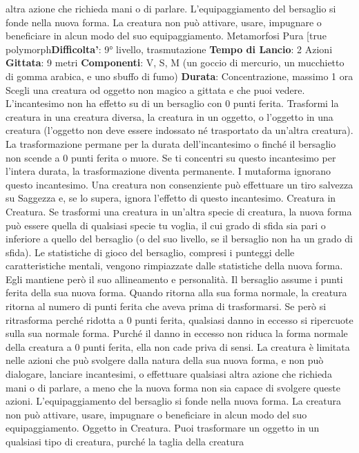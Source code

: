 \begin{multicols}{2}
altra azione che richieda mani o di parlare.
L’equipaggiamento del bersaglio si fonde nella nuova
forma. La creatura non può attivare, usare, impugnare o
beneficiare in alcun modo del suo equipaggiamento.
Metamorfosi Pura
[true polymorph\textbf{Difficolta'}:
9° livello, trasmutazione
\textbf{Tempo di Lancio}: 2 Azioni
\textbf{Gittata}: 9 metri
\textbf{Componenti}: V, S, M (un goccio di mercurio, un
mucchietto di gomma arabica, e uno sbuffo di fumo)
\textbf{Durata}: Concentrazione, massimo 1 ora
Scegli una creatura od oggetto non magico a gittata e
che puoi vedere. L’incantesimo non ha effetto su di un
bersaglio con 0 punti ferita. Trasformi la creatura in una
creatura diversa, la creatura in un oggetto, o l’oggetto in
una creatura (l’oggetto non deve essere indossato né
trasportato da un’altra creatura). La trasformazione
permane per la durata dell’incantesimo o finché il
bersaglio non scende a 0 punti ferita o muore. Se ti
concentri su questo incantesimo per l’intera durata, la
trasformazione diventa permanente.
I mutaforma ignorano questo incantesimo. Una creatura
non consenziente può effettuare un tiro salvezza su
Saggezza e, se lo supera, ignora l’effetto di questo
incantesimo.
Creatura in Creatura. Se trasformi una creatura in
un’altra specie di creatura, la nuova forma può essere
quella di qualsiasi specie tu voglia, il cui grado di sfida
sia pari o inferiore a quello del bersaglio (o del suo
livello, se il bersaglio non ha un grado di sfida). Le
statistiche di gioco del bersaglio, compresi i punteggi
delle caratteristiche mentali, vengono rimpiazzate dalle
statistiche della nuova forma. Egli mantiene però il suo
allineamento e personalità.
Il bersaglio assume i punti ferita della sua nuova forma.
Quando ritorna alla sua forma normale, la creatura
ritorna al numero di punti ferita che aveva prima di
trasformarsi. Se però si ritrasforma perché ridotta a 0
punti ferita, qualsiasi danno in eccesso si ripercuote
sulla sua normale forma. Purché il danno in eccesso
non riduca la forma normale della creatura a 0 punti
ferita, ella non cade priva di sensi.
La creatura è limitata nelle azioni che può svolgere
dalla natura della sua nuova forma, e non può
dialogare, lanciare incantesimi, o effettuare qualsiasi
altra azione che richieda mani o di parlare, a meno che
la nuova forma non sia capace di svolgere queste
azioni.
L’equipaggiamento del bersaglio si fonde nella nuova
forma. La creatura non può attivare, usare, impugnare o
beneficiare in alcun modo del suo equipaggiamento.
Oggetto in Creatura. Puoi trasformare un oggetto in un
qualsiasi tipo di creatura, purché la taglia della creatura

\end{multicols}
